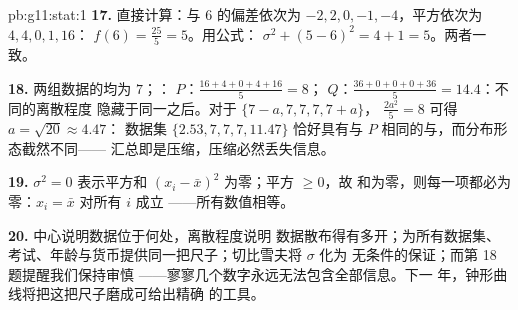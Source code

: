 \begin{solution}{pb:g11:stat:1}
\textbf{17.} 直接计算：与 $6$ 的偏差依次为
$-2, 2, 0, -1, -4$，平方依次为 $4, 4, 0, 1, 16$：
$f(6) = \frac{25}{5} = 5$。用公式：
$\sigma^2 + (5 - 6)^2 = 4 + 1 = 5$。两者一致。

\textbf{18.} 两组数据的均为 $7$；：
$P$：$\frac{16 + 4 + 0 + 4 + 16}{5} = 8$；
$Q$：$\frac{36 + 0 + 0 + 0 + 36}{5} = 14.4$：不同的离散程度
隐藏于同一之后。对于 $\{7 - a, 7, 7, 7, 7 + a\}$，
$\frac{2a^2}{5} = 8$ 可得 $a = \sqrt{20} \approx 4.47$：
数据集 $\{2.53, 7, 7, 7, 11.47\}$ 恰好具有与
$P$ 相同的与，而分布形态截然不同——
汇总即是压缩，压缩必然丢失信息。

\textbf{19.} $\sigma^2 = 0$ 表示平方和
$(x_i - \bar x)^2$ 为零；平方 $\geq 0$，故
和为零，则每一项都必为零：$x_i = \bar x$ 对所有 $i$ 成立
——所有数值相等。

\textbf{20.} 中心说明数据位于何处，离散程度说明
数据散布得有多开；为所有数据集、
考试、年龄与货币提供同一把尺子；切比雪夫将 $\sigma$ 化为
无条件的保证；而第 18 题提醒我们保持审慎
——寥寥几个数字永远无法包含全部信息。下一
年，钟形曲线将把这把尺子磨成可给出精确
的工具。
\end{solution}
